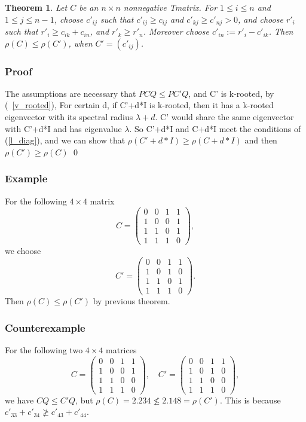 \documentclass{beamer}
\theoremstyle{plain}
\newtheorem{thm}{Theorem}[section]
\theoremstyle{definition}
\begin{document}
\begin{frame}

\begin{thm}
    Let $C$ be an $n\times n$ nonnegative Tmatrix. For $1\leq i \leq n$ and $1\leq j\leq n-1$, choose $c'_{ij}$
    such that $c'_{ij}\geq c_{ij}$ and $c'_{kj}\geq c'_{nj}>0$, and choose $r'_i$ such that $r'_i\geq c_{ik}+c_{in}$, and
    $r'_k \geq r'_n$. Moreover choose $c'_{in}:=r'_i-c'_{ik}$. Then $\rho(C)\leq \rho(C')$, when $C'=(c'_{ij})$.
\end{thm}

\end{frame}

\begin{frame}
    \frametitle{Proof}

The assumptions are necessary that $PCQ \leq PC'Q$, and C' is k-rooted, by (~\ref{v_rooted}), For certain d, if C'+d*I is k-rooted, then it has a k-rooted eigenvector with its spectral radius $\lambda + d$. C' would share the same eigenvector with C'+d*I and has eigenvalue $\lambda$. So C'+d*I and C+d*I meet the conditions of (\ref{l_diag}), and we can show that $\rho(C' + d*I) \geq \rho(C +d*I)$ and then $\rho(C') \geq \rho(C)$  \qed    

\end{frame}

\begin{frame}
    \frametitle{ Example}
    For the following $4\times 4$ matrix
    $$C=\begin{pmatrix}
    0 & 0 & 1 & 1\\
    1 & 0 & 0 & 1\\
    1 & 1 & 0 & 1\\
    1 & 1 & 1 & 0
    \end{pmatrix},$$
    we choose
    $$C'=\begin{pmatrix}
    0 & 0 & 1 & 1\\
    1 & 0 & 1 &  0\\
    1 & 1 & 0 & 1\\
    1 & 1 & 1 & 0
    \end{pmatrix}.$$
    Then
    $\rho(C)\leq \rho(C')$ by previous theorem.
\end{frame}

\begin{frame}
    \frametitle{Counterexample}
    For the following two $4\times 4$ matrices
    $$C=\begin{pmatrix}
    0 & 0 & 1 & 1\\
    1 & 0 & 0 & 1\\
    1 & 1 & 0 & 0\\
    1 & 1 & 1 & 0
    \end{pmatrix},\quad C'=\begin{pmatrix}
    0 & 0 & 1 & 1\\
    1 & 0 & 1 &  0\\
    1 & 1 & 0 & 0\\
    1 & 1 & 1 & 0
    \end{pmatrix},$$ 
    we have $CQ\leq C'Q$, but 
    $\rho(C)=2.234\not\leq 2.148= \rho(C')$. 
    This is because $c'_{33}+c'_{34}\not\geq c'_{43}+c'_{44}$. 
\end{frame}
\end{document}
